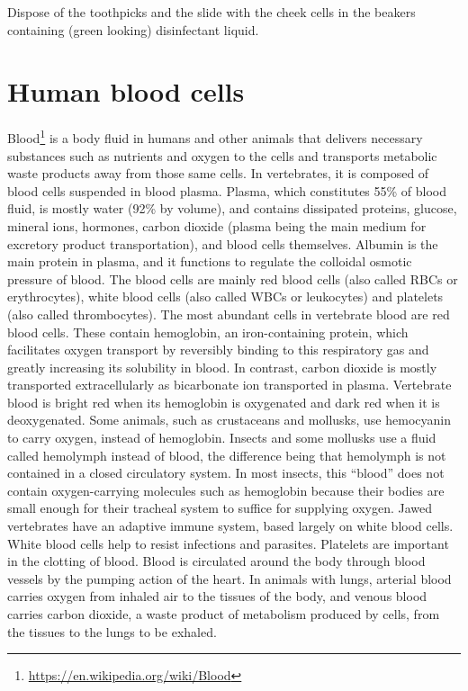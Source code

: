 \documentclass[]{book}
\let\rmarkdownfootnote\footnote%
\def\footnote{\protect\rmarkdownfootnote}
\renewcommand{\href}[2]{#2\footnote{\url{#1}}}
\begin{document}
Dispose of the toothpicks and the slide with the cheek cells in the beakers containing (green looking) disinfectant liquid.

\hypertarget{human-blood-cells}{%
\section{Human blood cells}\label{human-blood-cells}}

\href{https://en.wikipedia.org/wiki/Blood}{Blood} is a body fluid in humans and other animals that delivers necessary substances such as nutrients and oxygen to the cells and transports metabolic waste products away from those same cells. In vertebrates, it is composed of blood cells suspended in blood plasma. Plasma, which constitutes 55\% of blood fluid, is mostly water (92\% by volume), and contains dissipated proteins, glucose, mineral ions, hormones, carbon dioxide (plasma being the main medium for excretory product transportation), and blood cells themselves. Albumin is the main protein in plasma, and it functions to regulate the colloidal osmotic pressure of blood. The blood cells are mainly red blood cells (also called RBCs or erythrocytes), white blood cells (also called WBCs or leukocytes) and platelets (also called thrombocytes). The most abundant cells in vertebrate blood are red blood cells. These contain hemoglobin, an iron-containing protein, which facilitates oxygen transport by reversibly binding to this respiratory gas and greatly increasing its solubility in blood. In contrast, carbon dioxide is mostly transported extracellularly as bicarbonate ion transported in plasma.
Vertebrate blood is bright red when its hemoglobin is oxygenated and dark red when it is deoxygenated. Some animals, such as crustaceans and mollusks, use hemocyanin to carry oxygen, instead of hemoglobin. Insects and some mollusks use a fluid called hemolymph instead of blood, the difference being that hemolymph is not contained in a closed circulatory system. In most insects, this ``blood'' does not contain oxygen-carrying molecules such as hemoglobin because their bodies are small enough for their tracheal system to suffice for supplying oxygen.
Jawed vertebrates have an adaptive immune system, based largely on white blood cells. White blood cells help to resist infections and parasites. Platelets are important in the clotting of blood.
Blood is circulated around the body through blood vessels by the pumping action of the heart. In animals with lungs, arterial blood carries oxygen from inhaled air to the tissues of the body, and venous blood carries carbon dioxide, a waste product of metabolism produced by cells, from the tissues to the lungs to be exhaled.
\end{document}
